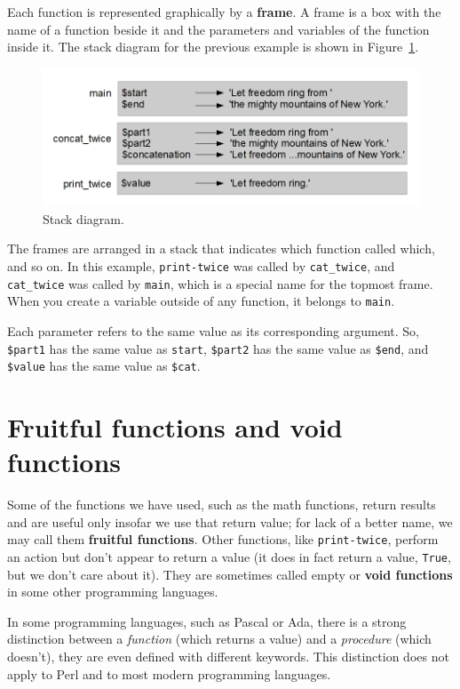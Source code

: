 Each function is represented graphically by a {\bf frame}.  A frame 
is a box with the name of a function beside it and the parameters 
and variables of the function inside it.  The stack diagram for 
the previous example is shown in Figure~\ref{fig.stack}.

\begin{figure}
\centerline
{\includegraphics[scale=1.2]{figs/stack_diagram.png}}
\caption{Stack diagram.}
\label{fig.stack}
\end{figure}


The frames are arranged in a stack that indicates which function
called which, and so on.  In this example, \verb"print-twice"
was called by \verb"cat_twice", and \verb"cat_twice" was called by 
\verb"main", which is a special name for the topmost frame.  When
you create a variable outside of any function, it belongs to 
\verb"main".

Each parameter refers to the same value as its corresponding
argument.  So, {\tt \$part1} has the same value as
{\tt start}, {\tt \$part2} has the same value as {\tt \$end},
and {\tt \$value} has the same value as {\tt \$cat}.


\section{Fruitful functions and void functions}

Some of the functions we have used, such as the 
math functions, return results and are useful only insofar 
we use that return value; for lack of a better name, we 
may call them {\bf fruitful functions}.  Other functions, 
like \verb"print-twice", perform an action but don't appear 
to return a value (it does in fact return a value, {\tt True}, 
but we don't care about it).  They are sometimes called empty or 
{\bf void functions} in some other programming languages.

In some programming languages, such as Pascal or Ada, there 
is a strong distinction between a \emph{function} (which 
returns a value) and a \emph{procedure} (which doesn't), 
they are even defined with different keywords. This 
distinction does not apply to Perl and to most modern 
programming languages.

